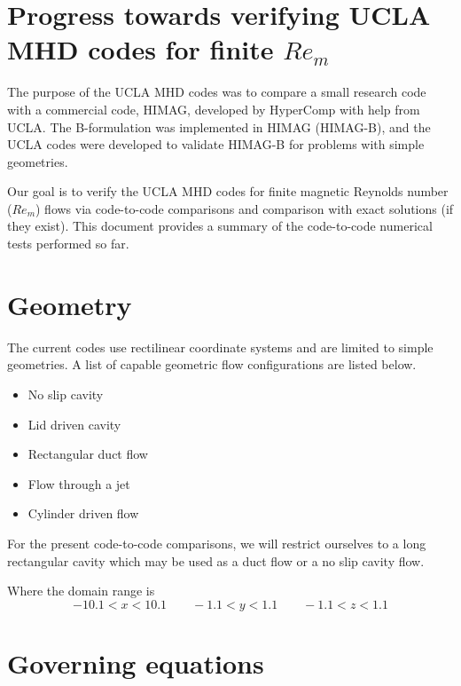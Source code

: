\documentclass[11pt]{article}
\begin{document}
\doublespacing
\MOONSTITLE
\maketitle

\section{Progress towards verifying UCLA MHD codes for finite \texorpdfstring{$Re_m$}{Rm}}
The purpose of the UCLA MHD codes was to compare a small research code with a commercial code, HIMAG, developed by HyperComp with help from UCLA. The B-formulation was implemented in HIMAG (HIMAG-B), and the UCLA codes were developed to validate HIMAG-B for problems with simple geometries.

Our goal is to verify the UCLA MHD codes for finite magnetic Reynolds number ($Re_m$) flows via code-to-code comparisons and comparison with exact solutions (if they exist). This document provides a summary of the code-to-code numerical tests performed so far.


\section{Geometry}
The current codes use rectilinear coordinate systems and are limited to simple geometries. A list of capable geometric flow configurations are listed below.

\begin{itemize}
\item No slip cavity
\item Lid driven cavity
\item Rectangular duct flow
\item Flow through a jet
\item Cylinder driven flow
\end{itemize}

For the present code-to-code comparisons, we will restrict ourselves to a long rectangular cavity which may be used as a duct flow or a no slip cavity flow.


Where the domain range is
\begin{equation}
	-10.1 < x < 10.1 \qquad -1.1 < y < 1.1 \qquad -1.1 < z < 1.1
\end{equation}

\section{Governing equations}
\end{document}
